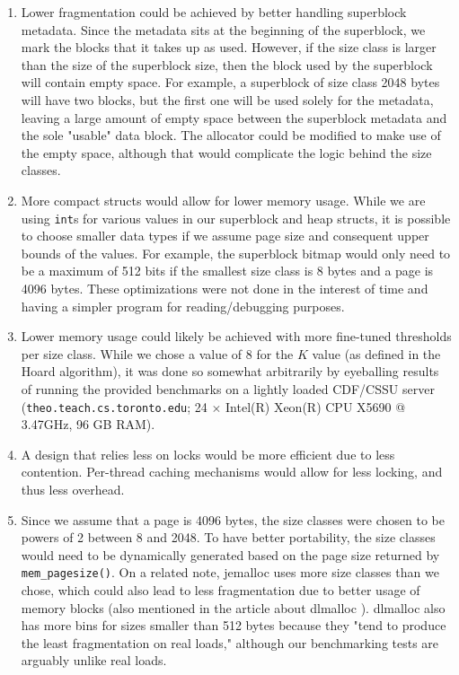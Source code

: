 \documentclass[11pt,twoside]{article}
\newcommand{\inlinecode}{\texttt}
\begin{document}
\begin{enumerate}
    \item
    Lower fragmentation could be achieved by better handling superblock metadata. Since the metadata sits at the beginning of the superblock, we mark the blocks that it takes up as used. However, if the size class is larger than the size of the superblock size, then the block used by the superblock will contain empty space. For example, a superblock of size class 2048 bytes will have two blocks, but the first one will be used solely for the metadata, leaving a large amount of empty space between the superblock metadata and the sole "usable" data block. The allocator could be modified to make use of the empty space, although that would complicate the logic behind the size classes.
    
    \item
    More compact structs would allow for lower memory usage. While we are using \inlinecode{int}s for various values in our superblock and heap structs, it is possible to choose smaller data types if we assume page size and consequent upper bounds of the values. For example, the superblock bitmap would only need to be a maximum of 512 bits if the smallest size class is 8 bytes and a page is 4096 bytes. These optimizations were not done in the interest of time and having a simpler program for reading/debugging purposes.
    
    \item
    Lower memory usage could likely be achieved with more fine-tuned thresholds per size class. While we chose a value of 8 for the $K$ value (as defined in the Hoard algorithm), it was done so somewhat arbitrarily by eyeballing results of running the provided benchmarks on a lightly loaded CDF/CSSU server (\inlinecode{theo.teach.cs.toronto.edu}; 24 $\times$ Intel(R) Xeon(R) CPU X5690 @ 3.47GHz, 96 GB RAM).
    
    \item
    A design that relies less on locks would be more efficient due to less contention. Per-thread caching mechanisms would allow for less locking, and thus less overhead.
    
    \item
    Since we assume that a page is 4096 bytes, the size classes were chosen to be powers of 2 between 8 and 2048. To have better portability, the size classes would need to be dynamically generated based on the page size returned by \inlinecode{mem\_pagesize()}. On a related note, jemalloc uses more size classes than we chose, which could also lead to less fragmentation due to better usage of memory blocks (also mentioned in the article about dlmalloc \cite{dlmalloc}). dlmalloc also has more bins for sizes smaller than 512 bytes because they "tend to produce the least fragmentation on real loads," although our benchmarking tests are arguably unlike real loads.
\end{enumerate}
\end{document}
